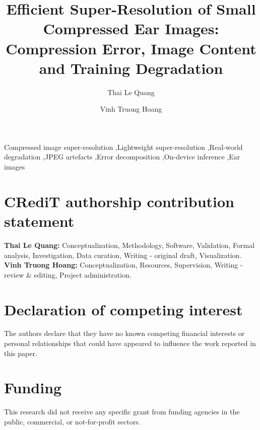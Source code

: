 \documentclass[preprint,12pt]{elsarticle}
\begin{document}
\begin{frontmatter}
\title{Efficient Super-Resolution of Small Compressed Ear Images: Compression Error, Image Content and Training Degradation}
\author[a,b]{Thai Le Quang}
\author[a]{Vinh Truong Hoang\texorpdfstring{}{}}
\begin{abstract}

\end{abstract}
\begin{keyword}
Compressed image super-resolution \sep Lightweight super-resolution \sep Real-world degradation \sep JPEG artefacts \sep Error decomposition \sep On-device inference \sep Ear images
\end{keyword}
\end{frontmatter}









\section*{CRediT authorship contribution statement}
\textbf{Thai Le Quang:} Conceptualization, Methodology, Software, Validation, Formal analysis, Investigation, Data curation, Writing - original draft, Visualization.
\textbf{Vinh Truong Hoang:} Conceptualization, Resources, Supervision, Writing - review \& editing, Project administration.

\section*{Declaration of competing interest}
The authors declare that they have no known competing financial interests or personal relationships that could have appeared to influence the work reported in this paper.

\section*{Funding}
This research did not receive any specific grant from funding agencies in the public, commercial, or not-for-profit sectors.
\end{document}
